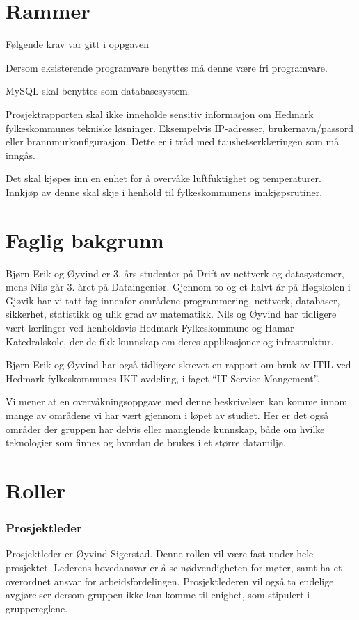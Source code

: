 \section{Rammer}
Følgende krav var gitt i oppgaven
\begin{itemize*}
	\item Dersom eksisterende programvare benyttes må denne være fri programvare.
	\item MySQL skal benyttes som databasesystem.
	\item Prosjektrapporten skal ikke inneholde sensitiv informasjon om Hedmark fylkeskommunes tekniske løsninger. Eksempelvis IP-adresser, brukernavn/passord eller brannmurkonfigurasjon. Dette er i tråd med taushetserklæringen som må inngås.
	\item Det skal kjøpes inn en enhet for å overvåke luftfuktighet og temperaturer. Innkjøp av denne skal skje i henhold til fylkeskommunens innkjøpsrutiner.
\end{itemize*}

\section{Faglig bakgrunn}
Bjørn-Erik og Øyvind er 3. års studenter på Drift av nettverk og datasystemer, mens Nils går 3. året på Dataingeniør. Gjennom to og et halvt år på Høgskolen i Gjøvik har vi tatt fag innenfor områdene programmering, nettverk, databaser, sikkerhet, statistikk og ulik grad av matematikk. Nils og Øyvind har tidligere vært lærlinger ved henholdsvis Hedmark Fylkeskommune og Hamar Katedralskole, der de fikk kunnskap om deres applikasjoner og infrastruktur.

Bjørn-Erik og Øyvind har også tidligere skrevet en rapport om bruk av ITIL ved Hedmark fylkeskommunes IKT-avdeling, i faget ``IT Service Mangement''.

Vi mener at en overvåkningsoppgave med denne beskrivelsen kan komme innom mange av områdene vi har vært gjennom i løpet av studiet. Her er det også områder der gruppen har delvis eller manglende kunnskap, både om hvilke teknologier som finnes og hvordan de brukes i et større datamiljø.

\section{Roller}
\subsubsection{Prosjektleder}
Prosjektleder er Øyvind Sigerstad. Denne rollen vil være fast under hele prosjektet. Lederens hovedansvar er å se nødvendigheten for møter, samt ha et overordnet ansvar for arbeidsfordelingen. Prosjektlederen vil også ta endelige avgjørelser dersom gruppen ikke kan komme til enighet, som stipulert i gruppereglene.

